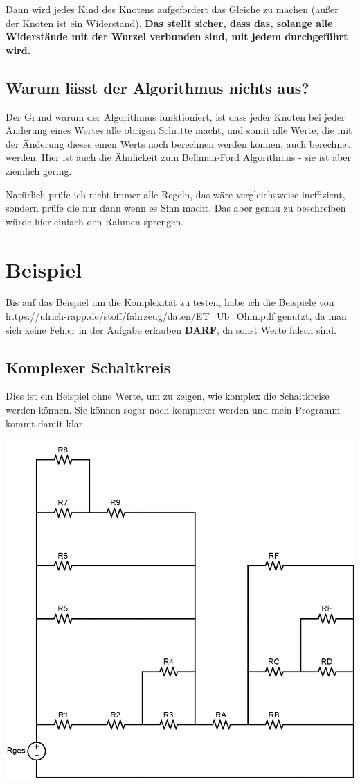 \documentclass[a4paper,10pt,ngerman]{scrartcl}
\begin{document}
Dann wird jedes Kind des Knotens aufgefordert das Gleiche zu machen (außer der Knoten ist ein Widerstand). \textbf{Das stellt sicher, dass das, solange alle Widerstände mit der Wurzel verbunden sind, mit jedem durchgeführt wird.}

\subsection{Warum lässt der Algorithmus nichts aus?}

Der Grund warum der Algorithmus funktioniert, ist dass jeder Knoten bei jeder Änderung eines Wertes alle obrigen Schritte macht, und somit alle Werte, die mit der Änderung dieses einen Werts noch berechnen werden können, auch berechnet werden. Hier ist auch die Ähnlickeit zum Bellman-Ford Algorithmus - sie ist aber ziemlich gering.

Natürlich prüfe ich nicht immer alle Regeln, das wäre vergleichsweise ineffizient, sondern prüfe die nur dann wenn es Sinn macht. Das aber genau zu beschreiben würde hier einfach den Rahmen sprengen.

\newpage
\section{Beispiel}

Bis auf das Beispiel um die Komplexität zu testen, habe ich die Beispiele von \url{https://ulrich-rapp.de/stoff/fahrzeug/daten/ET_Ub_Ohm.pdf} genutzt, da man sich keine Fehler in der Aufgabe erlauben \textbf{DARF}, da sonst Werte falsch sind.

\subsection{Komplexer Schaltkreis}

Dies ist ein Beispiel ohne Werte, um zu zeigen, wie komplex die Schaltkreise werden können. Sie können sogar noch komplexer werden und mein Programm kommt damit klar.

\includegraphics[width=\textwidth]{circuit2.png}
\end{document}
